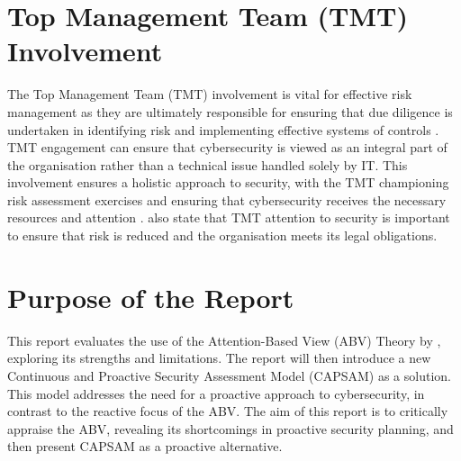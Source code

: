 \section{Top Management Team (TMT) Involvement}
The Top Management Team (TMT) involvement is vital for effective risk management as they are ultimately responsible for ensuring that due diligence is undertaken in identifying risk and implementing effective systems of controls \citep{fazlida2015information}. TMT engagement can ensure that cybersecurity is viewed as an integral part of the organisation rather than a technical issue handled solely by IT. This involvement ensures a holistic approach to security, with the TMT championing risk assessment exercises and ensuring that cybersecurity receives the necessary resources and attention \citep{shaikh2023information}. \citet{fazlida2015information} also state that TMT attention to security is important to ensure that risk is reduced and the organisation meets its legal obligations.

\section{Purpose of the Report}
This report evaluates the use of the Attention-Based View (ABV) Theory by \citet{shaikh2023information}, exploring its strengths and limitations. The report will then introduce a new Continuous and Proactive Security Assessment Model (CAPSAM) as a solution. This model addresses the need for a proactive approach to cybersecurity, in contrast to the reactive focus of the ABV. The aim of this report is to critically appraise the ABV, revealing its shortcomings in proactive security planning, and then present CAPSAM as a proactive alternative.